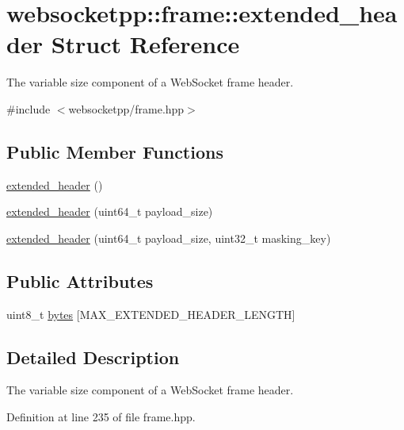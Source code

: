 \hypertarget{structwebsocketpp_1_1frame_1_1extended__header}{}\section{websocketpp\+:\+:frame\+:\+:extended\+\_\+header Struct Reference}
\label{structwebsocketpp_1_1frame_1_1extended__header}


The variable size component of a Web\+Socket frame header.  




{\ttfamily \#include $<$websocketpp/frame.\+hpp$>$}

\subsection*{Public Member Functions}
\begin{DoxyCompactItemize}
\item 
\hyperlink{structwebsocketpp_1_1frame_1_1extended__header_a6015c1b4ce066acdaef80e83b716b09e}{extended\+\_\+header} ()
\item 
\hyperlink{structwebsocketpp_1_1frame_1_1extended__header_a0fdbc1aaf81b56d61cc962fd724d3ffa}{extended\+\_\+header} (uint64\+\_\+t payload\+\_\+size)
\item 
\hyperlink{structwebsocketpp_1_1frame_1_1extended__header_af94b7d3a232117abfbd2b876025ab451}{extended\+\_\+header} (uint64\+\_\+t payload\+\_\+size, uint32\+\_\+t masking\+\_\+key)
\end{DoxyCompactItemize}
\subsection*{Public Attributes}
\begin{DoxyCompactItemize}
\item 
uint8\+\_\+t \hyperlink{structwebsocketpp_1_1frame_1_1extended__header_a64507c32b568d0894b2bf3a2513debd1}{bytes} \mbox{[}M\+A\+X\+\_\+\+E\+X\+T\+E\+N\+D\+E\+D\+\_\+\+H\+E\+A\+D\+E\+R\+\_\+\+L\+E\+N\+G\+T\+H\mbox{]}
\end{DoxyCompactItemize}


\subsection{Detailed Description}
The variable size component of a Web\+Socket frame header. 

Definition at line 235 of file frame.\+hpp.



